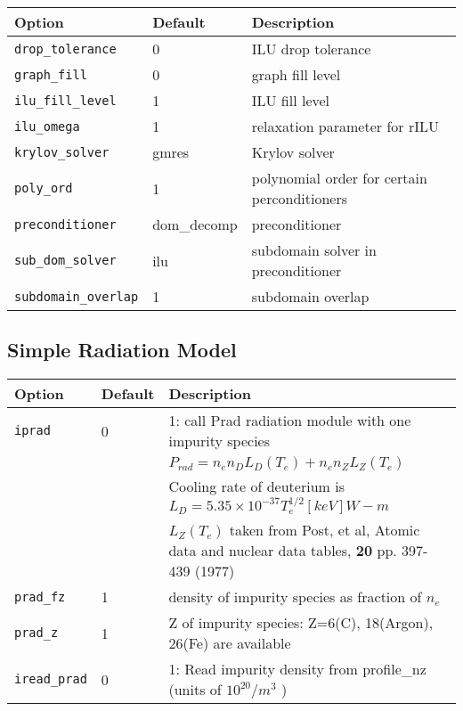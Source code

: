 \begin{tabular}{llp{4.5in}}
  \textbf{Option}&\textbf{Default}&\textbf{Description}\\
  \hline
 \texttt{drop\_tolerance}    & 0 &   ILU drop tolerance \\
 \texttt{graph\_fill}        & 0 & graph fill level \\
 \texttt{ilu\_fill\_level}   & 1 & ILU fill level \\
 \texttt{ilu\_omega}         & 1 & relaxation parameter for rILU \\
 \texttt{krylov\_solver}     & gmres & Krylov solver \\
 \texttt{poly\_ord}          & 1     & polynomial order for certain perconditioners \\
 \texttt{preconditioner}     &dom\_decomp & preconditioner \\
 \texttt{sub\_dom\_solver}   & ilu & subdomain solver in preconditioner \\
 \texttt{subdomain\_overlap} & 1   & subdomain overlap 

\end{tabular}

\subsection{Simple Radiation Model}

\begin{tabular}{llp{4.5in}}
  \textbf{Option}&\textbf{Default}&\textbf{Description}\\
  \hline
 \texttt{iprad}    & 0 & 1: call Prad radiation module with one impurity species \\
                   &   & $P_{rad} = n_e n_D L_D (T_e) + n_e n_Z L_Z(T_e)   $  \\
                   &   & Cooling rate of deuterium is $L_D = 5.35 \times 10^{-37}T_e^{1/2}[keV] W-m $ \\
                   &   & $L_Z(T_e)$ taken from Post, et al, Atomic data and nuclear data tables,
                                      {\bf 20} pp. 397-439 (1977)  \\
 \texttt{prad\_fz}  & 1 & density of impurity species as fraction of $n_e$ \\
 \texttt{prad\_z}      & 1 & Z of impurity species: Z=6(C), 18(Argon), 26(Fe) are available \\
 \texttt{iread\_prad}  & 0 & 1: Read impurity density from profile\_nz (units of $10^{20}/m^3$ ) 
\end{tabular}

